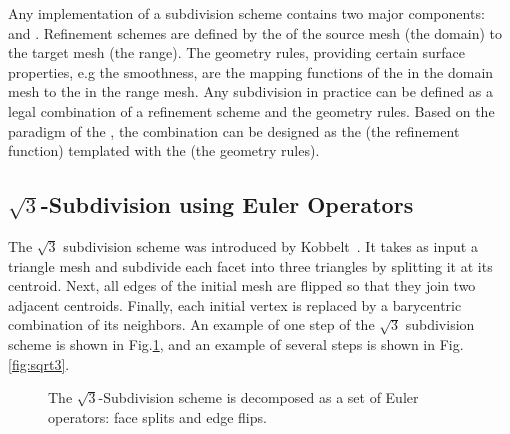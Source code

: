 \documentclass[letter,twoside,10pt]{article}
\begin{document}
Any implementation of a subdivision scheme contains two major
components:  and .
Refinement schemes are defined by the 
 of the source 
mesh (the domain) to the target mesh (the range). The geometry rules,
providing certain surface properties, e.g the smoothness, are the
mapping functions of the  in the domain mesh to the
 in the range mesh. Any subdivision in practice can
be defined as a legal combination of a refinement scheme and the
geometry rules. Based on the paradigm of the
 \cite{a-rotm-02}, the combination can be
designed as the  (the refinement function)
templated with the  (the geometry rules).

\subsection{$\sqrt{3}$-Subdivision using Euler Operators}

\label{sec:subdivision_euler}

The $\sqrt{3}$ subdivision scheme was introduced by
Kobbelt~\cite{k-sqrt3-00}. It takes as input a triangle mesh and
subdivide each facet into three triangles by splitting it at its
centroid. Next, all edges of the initial mesh are flipped so that they
join two adjacent centroids. Finally, each initial vertex is replaced
by a barycentric combination of its neighbors. An example of one step
of the $\sqrt{3}$ subdivision scheme is shown in
Fig.\ref{fig:sqrt3_basic}, and an example of several steps is shown in
Fig.\ref{fig:sqrt3}.


\begin{figure}[htb]
    \caption{The $\sqrt{3}$-Subdivision scheme is decomposed as
             a set of Euler operators: face splits and edge flips.}
    \label{fig:sqrt3_basic}
\end{figure}

{ 

\scriptsize
\begin{verbatim}



\end{verbatim}
}
\end{document}
